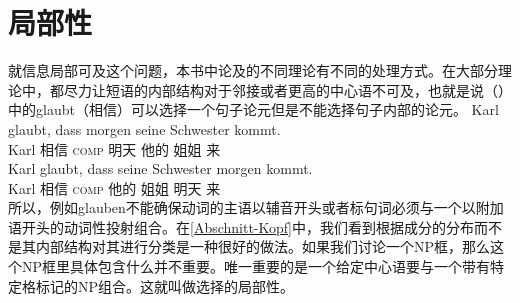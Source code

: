 
\section{局部性}
\label{Abschnitt-Diskussion-Lokalitaet}\label{sec-locality}

就信息局部可及这个问题，本书中论及的不同理论有不同的处理方式。在大部分理论中，都尽力让短语的内部结构对于邻接或者更高的中心语不可及，也就是说（）中的glaubt（相信）可以选择一个句子论元但是不能选择句子内部的论元。
\eal
\ex 
\gll Karl glaubt, dass morgen seine Schwester kommt.\\
	 Karl 相信 \textsc{comp} 明天 他的 姐姐 来\\
\ex 
\gll Karl glaubt, dass seine Schwester morgen kommt.\\
	 Karl 相信 \textsc{comp} 他的 姐姐 明天 来\\
\zl
所以，例如glauben不能确保动词的主语以辅音开头或者标句词必须与一个以附加语开头的动词性投射组合。在\ref{Abschnitt-Kopf}中，我们看到根据成分的分布而不是其内部结构对其进行分类是一种很好的做法。如果我们讨论一个NP框，那么这个NP框里具体包含什么并不重要。唯一重要的是一个给定中心语要与一个带有特定格标记的NP组合。这就叫做选择的局部性。

